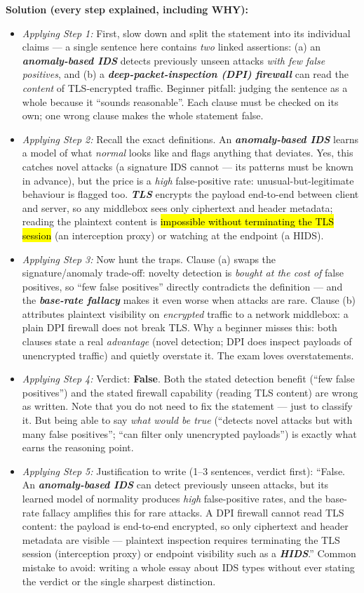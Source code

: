 \documentclass[12pt, a4paper]{article}
\newcommand{\term}[1]{\textbf{\textit{#1}}}        %
\newcommand{\imp}[1]{\hl{#1}}                       %
\begin{document}
\textbf{Solution (every step explained, including WHY):}
\begin{itemize}
    \item \textit{Applying Step 1:} First, slow down and split the statement into its individual claims --- a single sentence here contains \emph{two} linked assertions: (a) an \term{anomaly-based IDS} detects previously unseen attacks \emph{with few false positives}, and (b) a \term{deep-packet-inspection (DPI) firewall} can read the \emph{content} of TLS-encrypted traffic. Beginner pitfall: judging the sentence as a whole because it ``sounds reasonable''. Each clause must be checked on its own; one wrong clause makes the whole statement false.
    \item \textit{Applying Step 2:} Recall the exact definitions. An \term{anomaly-based IDS} learns a model of what \emph{normal} looks like and flags anything that deviates. Yes, this catches novel attacks (a signature IDS cannot --- its patterns must be known in advance), but the price is a \emph{high} false-positive rate: unusual-but-legitimate behaviour is flagged too. \term{TLS} encrypts the payload end-to-end between client and server, so any middlebox sees only ciphertext and header metadata; reading the plaintext content is \imp{impossible without terminating the TLS session} (an interception proxy) or watching at the endpoint (a HIDS).
    \item \textit{Applying Step 3:} Now hunt the traps. Clause (a) swaps the signature/anomaly trade-off: novelty detection is \emph{bought at the cost of} false positives, so ``few false positives'' directly contradicts the definition --- and the \term{base-rate fallacy} makes it even worse when attacks are rare. Clause (b) attributes plaintext visibility on \emph{encrypted} traffic to a network middlebox: a plain DPI firewall does not break TLS. Why a beginner misses this: both clauses state a real \emph{advantage} (novel detection; DPI does inspect payloads of unencrypted traffic) and quietly overstate it. The exam loves overstatements.
    \item \textit{Applying Step 4:} Verdict: \textbf{False}. Both the stated detection benefit (``few false positives'') and the stated firewall capability (reading TLS content) are wrong as written. Note that you do not need to fix the statement --- just to classify it. But being able to say \emph{what would be true} (``detects novel attacks but with many false positives''; ``can filter only unencrypted payloads'') is exactly what earns the reasoning point.
    \item \textit{Applying Step 5:} Justification to write (1--3 sentences, verdict first): ``False. An \term{anomaly-based IDS} can detect previously unseen attacks, but its learned model of normality produces \emph{high} false-positive rates, and the base-rate fallacy amplifies this for rare attacks. A DPI firewall cannot read TLS content: the payload is end-to-end encrypted, so only ciphertext and header metadata are visible --- plaintext inspection requires terminating the TLS session (interception proxy) or endpoint visibility such as a \term{HIDS}.'' Common mistake to avoid: writing a whole essay about IDS types without ever stating the verdict or the single sharpest distinction.

\end{itemize}
\end{document}
